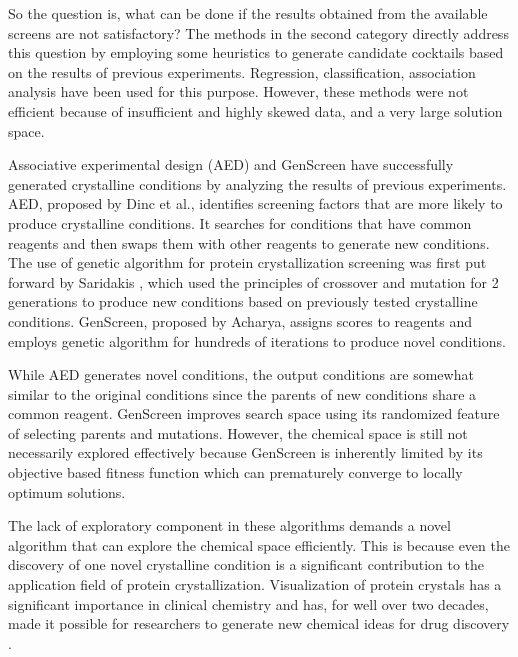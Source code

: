 So the question is, what can be done if the results obtained from the available screens are not satisfactory? The methods in the second category directly address this question by employing some heuristics to generate candidate cocktails based on the results of previous experiments. Regression, classification, association analysis have been used for this purpose\cite{DataMining1, DataMining2}. However, these methods were not efficient because of insufficient and highly skewed data, and a very large solution space\cite{DataMining3}.

Associative experimental design (AED) \cite{OptimizeAED,dinc_protein_2015} and GenScreen  \cite{SamyamThesis} have successfully generated crystalline conditions by analyzing the results of previous experiments. 
AED, proposed by Dinc et al., identifies screening factors that are more likely to produce crystalline conditions. It searches for conditions that have common reagents and then swaps them with other reagents to generate new conditions. 
The use of genetic algorithm for protein crystallization screening was first put forward by Saridakis  \cite{Emmanuel}, which used the principles of crossover and mutation for 2 generations to produce new conditions based on previously tested crystalline conditions. GenScreen, proposed by Acharya, assigns scores to reagents and employs genetic algorithm for hundreds of iterations to produce novel conditions\cite{SamyamThesis}.

While  AED generates novel conditions, the output conditions are somewhat similar to the original conditions since the parents of new conditions share a common reagent. GenScreen improves search space using its randomized feature of selecting parents and mutations. However, the chemical space is still not necessarily explored effectively because GenScreen is inherently limited by its objective based fitness function which can prematurely converge to locally optimum solutions.

The lack of exploratory component in these algorithms demands a novel algorithm that can explore the chemical space efficiently. This is because even the discovery of one novel crystalline condition is a significant contribution to the application field of protein crystallization. Visualization of protein crystals has a significant importance in clinical chemistry and has, for well over two decades, made it possible for researchers to generate new chemical ideas for drug discovery \cite{blundell2004high, williams2005recent, sharff2003high, kuhn2002genesis, hardy2003impact}.

